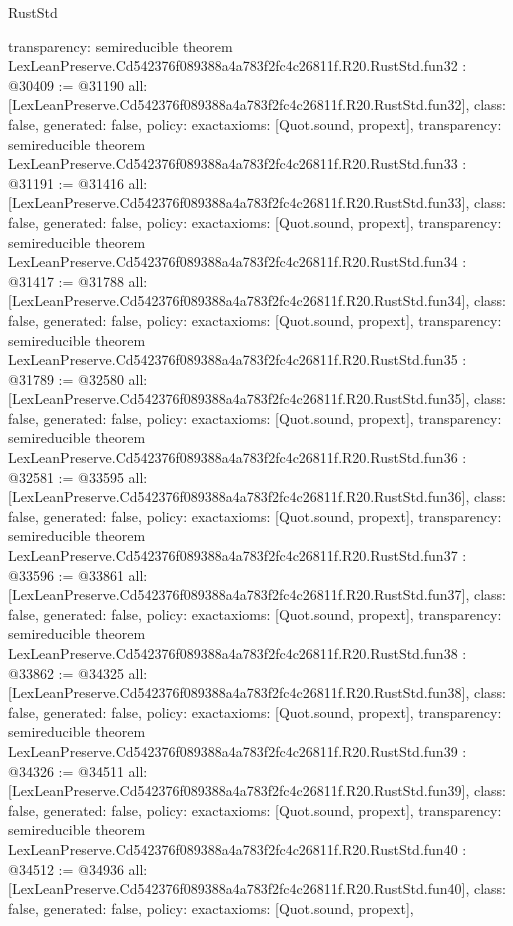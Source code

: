 \begin{lexlean}{RustStd}
\begin{coremodule}
{  transparency: semireducible
}
theorem LexLeanPreserve.Cd542376f089388a4a783f2fc4c26811f.R20.RustStd.fun32 : @30409 := @31190 {
  all: [LexLeanPreserve.Cd542376f089388a4a783f2fc4c26811f.R20.RustStd.fun32],
  class: false,
  generated: false,
  policy: exact{axioms: [Quot.sound, propext]},
  transparency: semireducible
}
theorem LexLeanPreserve.Cd542376f089388a4a783f2fc4c26811f.R20.RustStd.fun33 : @31191 := @31416 {
  all: [LexLeanPreserve.Cd542376f089388a4a783f2fc4c26811f.R20.RustStd.fun33],
  class: false,
  generated: false,
  policy: exact{axioms: [Quot.sound, propext]},
  transparency: semireducible
}
theorem LexLeanPreserve.Cd542376f089388a4a783f2fc4c26811f.R20.RustStd.fun34 : @31417 := @31788 {
  all: [LexLeanPreserve.Cd542376f089388a4a783f2fc4c26811f.R20.RustStd.fun34],
  class: false,
  generated: false,
  policy: exact{axioms: [Quot.sound, propext]},
  transparency: semireducible
}
theorem LexLeanPreserve.Cd542376f089388a4a783f2fc4c26811f.R20.RustStd.fun35 : @31789 := @32580 {
  all: [LexLeanPreserve.Cd542376f089388a4a783f2fc4c26811f.R20.RustStd.fun35],
  class: false,
  generated: false,
  policy: exact{axioms: [Quot.sound, propext]},
  transparency: semireducible
}
theorem LexLeanPreserve.Cd542376f089388a4a783f2fc4c26811f.R20.RustStd.fun36 : @32581 := @33595 {
  all: [LexLeanPreserve.Cd542376f089388a4a783f2fc4c26811f.R20.RustStd.fun36],
  class: false,
  generated: false,
  policy: exact{axioms: [Quot.sound, propext]},
  transparency: semireducible
}
theorem LexLeanPreserve.Cd542376f089388a4a783f2fc4c26811f.R20.RustStd.fun37 : @33596 := @33861 {
  all: [LexLeanPreserve.Cd542376f089388a4a783f2fc4c26811f.R20.RustStd.fun37],
  class: false,
  generated: false,
  policy: exact{axioms: [Quot.sound, propext]},
  transparency: semireducible
}
theorem LexLeanPreserve.Cd542376f089388a4a783f2fc4c26811f.R20.RustStd.fun38 : @33862 := @34325 {
  all: [LexLeanPreserve.Cd542376f089388a4a783f2fc4c26811f.R20.RustStd.fun38],
  class: false,
  generated: false,
  policy: exact{axioms: [Quot.sound, propext]},
  transparency: semireducible
}
theorem LexLeanPreserve.Cd542376f089388a4a783f2fc4c26811f.R20.RustStd.fun39 : @34326 := @34511 {
  all: [LexLeanPreserve.Cd542376f089388a4a783f2fc4c26811f.R20.RustStd.fun39],
  class: false,
  generated: false,
  policy: exact{axioms: [Quot.sound, propext]},
  transparency: semireducible
}
theorem LexLeanPreserve.Cd542376f089388a4a783f2fc4c26811f.R20.RustStd.fun40 : @34512 := @34936 {
  all: [LexLeanPreserve.Cd542376f089388a4a783f2fc4c26811f.R20.RustStd.fun40],
  class: false,
  generated: false,
  policy: exact{axioms: [Quot.sound, propext]},
}
\end{coremodule}
\end{lexlean}
